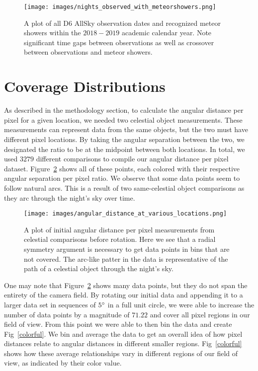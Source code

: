 \begin{figure}[ht!]
  \centering
  \texttt{[image: images/nights\_observed\_with\_meteorshowers.png]}
  \caption[A plot of all D6 AllSky observation dates and recognized meteor showers within the $2018-2019$ academic calendar year.]{A plot of all D6 AllSky observation dates and recognized meteor showers within the $2018-2019$ academic calendar year.  Note significant time gaps between observations as well as crossover between observations and meteor showers.}
  \label{dateplot}
\end{figure}




\section{Coverage Distributions}

As described in the methodology section, to calculate the angular distance per pixel for a given location, we needed two celestial object measurements.
These measurements can represent data from the same objects, but the two must have different pixel locations.
By taking the angular separation between the two, we designated the ratio to be at the midpoint between both locations.  
In total, we used $3279$ different comparisons to compile our angular distance per pixel dataset.  
Figure~\ref{angperpix1} shows all of these points, each colored with their respective angular separation per pixel ratio. 
We observe that some data points seem to follow natural arcs.
This is a result of two same-celestial object comparisons as they arc through the night's sky over time.


\begin{figure}[ht!]
  \centering
  \texttt{[image: images/angular\_distance\_at\_various\_locations.png]}
  \caption[A plot of initial angular distance per pixel measurements from celestial comparisons before rotation.]{A plot of initial angular distance per pixel measurements from celestial comparisons before rotation.  Here we see that a radial symmetry argument is necessary to get data points in bins that are not covered.  The arc-like patter in the data is representative of the path of a celestial object through the night's sky.}
  \label{angperpix1}
\end{figure}

One may note that Figure~\ref{angperpix1} shows many data points, but they do not span the entirety of the camera field. 
By rotating our initial data and appending it to a larger data set in sequences of $5\degree$ in a full unit circle, we were able to increase the number of data points by a magnitude of $71.22$ and cover all pixel regions in our field of view.
From this point we were able to then bin the data and create Fig~\ref{colorful}.
We bin and average the data to get an overall idea of how pixel distances relate to angular distances in different smaller regions.
Fig~\ref{colorful} shows how these average relationships vary in different regions of our field of view, as indicated by their color value.

